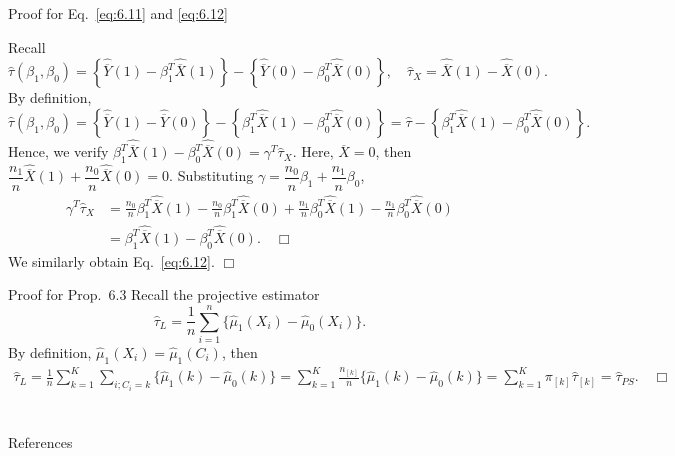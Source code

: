 \documentclass[aspectratio=169, 12pt]{beamer}
\begin{document}
\begin{frame}[label=pr-lin-cov-imbalance]{Proof for Eq.~\eqref{eq:6.11} and \eqref{eq:6.12}}

  {
    \small
    Recall 
    \[
    \widehat{\tau}(\beta_1,\beta_0)=\left\{\widehat{\overline{Y}}(1)-\beta_1^T\widehat{\overline{X}}(1)\right\}-\left\{\widehat{\overline{Y}}(0)-\beta_0^T\widehat{\overline{X}}(0)\right\}, 
    \quad
    \widehat{\tau}_X = \widehat{\overline{X}}(1)-\widehat{\overline{X}}(0).
    \]
    By definition, 
    \[
    \widehat{\tau}(\beta_1,\beta_0)=\left\{\widehat{\overline{Y}}(1)-\widehat{\overline{Y}}(0)\right\}-\left\{\beta_1^T\widehat{\overline{X}}(1)-\beta_0^T\widehat{\overline{X}}(0)\right\}=\widehat{\tau}-\left\{\beta_1^T\widehat{\overline{X}}(1)-\beta_0^T\widehat{\overline{X}}(0)\right\}.
    \] 
    Hence, we verify $\beta_1^T\widehat{\overline{X}}(1)-\beta_0^T\widehat{\overline{X}}(0)=\gamma^T\widehat{\tau}_X.$
    Here, $\overline{X}=0$, then $\dfrac{n_1}{n}\widehat{\overline{X}}(1)+\dfrac{n_0}{n}\widehat{\overline{X}}(0)=0.$
    Substituting $\gamma=\dfrac{n_0}{n}\beta_1+\dfrac{n_1}{n}\beta_0$,
    \begin{align*}
      \gamma^T\widehat{\tau}_X
    &= \frac{n_0}{n}\beta_1^T\widehat{\overline{X}}(1)-\frac{n_0}{n}\beta_1^T\widehat{\overline{X}}(0)+\frac{n_1}{n}\beta_0^T\widehat{\overline{X}}(1)-\frac{n_1}{n}\beta_0^T\widehat{\overline{X}}(0)\\
    &= \beta_1^T\widehat{\overline{X}}(1)-\beta_0^T\widehat{\overline{X}}(0). \quad \Box
    \end{align*}
    We similarly obtain Eq.~\eqref{eq:6.12}. $\Box$ 
  }
  \vfill
  \hfill\hyperlink{lin-cov-imbalance<1>}{}
\end{frame}

\begin{frame}[label=pr-prop-6-3]{Proof for Prop.~6.3}
  Recall the projective estimator $$\widehat{\tau}_{L}=\dfrac{1}{n}\sum_{i=1}^{n}\{\widehat{\mu}_1(X_i)-\widehat{\mu}_0(X_i)\}.$$
  By definition, $\widehat{\mu}_1(X_i)=\widehat{\mu}_1(C_i)$, then
  \begin{align*}
    \widehat{\tau}_L
    =\frac{1}{n}\sum_{k=1}^{K}\sum_{i;C_i=k}^{}\{\widehat{\mu}_1(k)-\widehat{\mu}_0(k)\}
    =\sum_{k=1}^{K}\frac{n_{[k]}}{n}\{\widehat{\mu}_1(k)-\widehat{\mu}_0(k)\}
    =\sum_{k=1}^{K}\pi_{[k]}\widehat{\tau}_{[k]}=\widehat{\tau}_{PS}.\quad \Box
  \end{align*}
  \vfill
  \hfill\hyperlink{prop-6-3<1>}{}
\end{frame}

\section{}
\begin{frame}{References}
  \beamerdefaultoverlayspecification{}
  \small
  
\end{frame}
\end{document}
